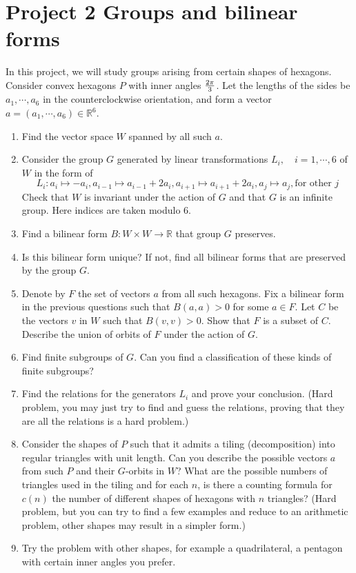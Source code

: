 \documentclass[12pt]{article}
\newcommand\R{\mathbb{R}}
\theoremstyle{definition}
\theoremstyle{remark}
\begin{document}
\section{Project 2 Groups and bilinear forms}
In this project, we will study groups arising from certain shapes of hexagons. Consider convex hexagons $P$ with inner angles $2\pi\over 3$. Let the lengths of the sides be $a_1, \cdots, a_6$ in the counterclockwise orientation, and form a vector $a=(a_1, \cdots, a_6)\in \R^6$. 
\begin{enumerate}
\item Find the vector space $W$ spanned by all such $a$.
\item Consider the group $G$ generated by linear transformations $L_i, \quad i=1, \cdots, 6$ of $W$ in the form of $$L_i\colon a_i\mapsto -a_i, a_{i-1}\mapsto a_{i-1}+2a_i, a_{i+1}\mapsto a_{i+1}+2a_i, a_j\mapsto a_j, \text{for other }j$$
  Check that $W$ is invariant under the action of $G$ and that $G$ is an infinite group. Here indices are taken modulo $6$.
\item Find a bilinear form $B\colon W\times W\to \R$ that group $G$ preserves.
\item Is this bilinear form unique? If not, find all bilinear forms that are preserved by the group $G$.

\item Denote by $F$ the set of vectors $a$ from all such hexagons. Fix a bilinear form in the previous questions such that $B(a, a)> 0$ for some $a\in F$. Let $C$ be the vectors $v$ in $W$ such that $B(v, v)> 0$.  Show that $F$ is a subset of $C$. Describe the union of orbits of $F$ under the action of $G$. 

\item Find finite subgroups of $G$. Can you find a classification of these kinds of finite subgroups?

\item Find the relations for the generators $L_i$ and prove your conclusion. (Hard problem, you may just try to find and guess the relations, proving that they are all the relations is a hard problem.)

\item Consider the shapes of $P$ such that it admits a tiling (decomposition) into regular triangles with unit length. Can you describe the possible vectors $a$ from such $P$ and their $G$-orbits in $W$? What are the possible numbers of triangles used in the tiling and for each $n$, is there a counting formula for $c(n)$ the number of different shapes of hexagons with $n$ triangles? (Hard problem, but you can try to find a few examples and reduce to an arithmetic problem, other shapes may result in a simpler form.)

\item Try the problem with other shapes, for example a quadrilateral, a pentagon with certain inner angles you prefer.

\end{enumerate}
\end{document}
